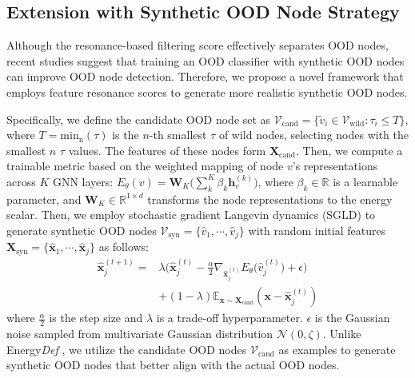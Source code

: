 \subsection{Extension with Synthetic OOD Node Strategy}\label{subsec_Train-OOD-classifer}
Although the resonance-based filtering score effectively separates OOD nodes, recent studies  \citep{gong2024energy} suggest that training an OOD classifier with synthetic OOD nodes can improve OOD node detection. Therefore, we propose a novel framework that employs feature resonance scores to generate more realistic synthetic OOD nodes. 

Specifically, we define the candidate OOD node set as \( \mathcal{V}_{\mathrm{cand}} = \{ \tilde{v}_i \in \mathcal{V}_{\mathrm{wild}} : \tau_i \leq T \} \), where \( T = \mathrm{min}_\mathrm{n}(\tau) \) is the \( n \)-th smallest \( \tau \) of wild nodes, selecting nodes with the smallest \( n \) \( \tau \) values. The features of these nodes form \( \boldsymbol{X}_{\mathrm{cand}} \).
Then, we compute a trainable metric based on the weighted mapping of node \( v \)'s representations across $K$ GNN layers:
$
    E_{\theta}(v) = \mathbf{W}_{K}\big( \sum_{k}^{K}\beta_{k}\mathbf{h}_v^{(k)} \big)
$,
where $\beta_{k} \in \mathbb{R}$ is a learnable parameter, and $\mathbf{W}_{K} \in \mathbb{R}^{1 \times d}$ transforms the node representations to the energy scalar. Then, we employ stochastic gradient Langevin dynamics (SGLD)  \citep{welling2011bayesian} to generate synthetic OOD nodes $\mathcal{V}_{\mathrm{syn}} = \{ \hat{v}_1, \cdots, \hat{v}_j \}$ with random initial features $\boldsymbol{X}_{\mathrm{syn}} = \{ \hat{\mathbf{x}}_1, \cdots, \hat{\mathbf{x}}_j \}$ as follows:
\begin{equation}
\begin{split}
    \hat{\mathbf{x}}_j^{(t+1)} = & \lambda \big (\hat{\mathbf{x}}_j^{(t)} - \frac{\alpha}{2}\nabla_{\hat{\mathbf{x}}_j^{(t)}}E_{\theta}\big( \hat{v}_j^{(t)} \big) + \epsilon \big)  \\
    &+ (1-\lambda)\mathbb{E}_{\mathbf{x}\sim \boldsymbol{X}_\mathrm{cand}}(\mathbf{x} - \hat{\mathbf{x}}_j^{(t)}) 
\end{split}
\end{equation}
where $\frac{\alpha}{2}$ is the step size and $\lambda$ is a trade-off hyperparameter. $\epsilon$ is the Gaussian noise sampled from multivariate Gaussian distribution $\mathcal{N}(0, \zeta)$.
Unlike Energy\textit{Def} \citep{gong2024energy}, we utilize the candidate OOD nodes $\mathcal{V}_{\mathrm{cand}}$ as examples to generate synthetic OOD nodes that better align with the actual OOD nodes. 
